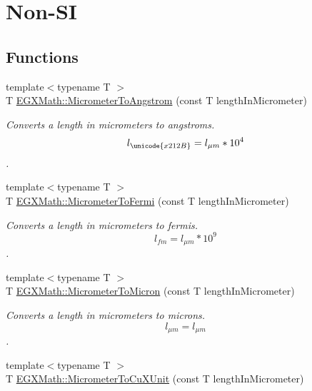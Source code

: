 \hypertarget{group___e_g_x_math-_conversions-_length_conversions-_s_i-_micrometer-_non-_s_i}{}\section{Non-\/\+SI}
\label{group___e_g_x_math-_conversions-_length_conversions-_s_i-_micrometer-_non-_s_i}
\subsection*{Functions}
\begin{DoxyCompactItemize}
\item 
{\footnotesize template$<$typename T $>$ }\\T \mbox{\hyperlink{group___e_g_x_math-_conversions-_length_conversions-_s_i-_micrometer-_non-_s_i_ga4b7df35169682046455e9a6f99447777}{E\+G\+X\+Math\+::\+Micrometer\+To\+Angstrom}} (const T length\+In\+Micrometer)
\begin{DoxyCompactList}\small\item\em Converts a length in micrometers to angstroms. \[ l_{\unicode{x212B}}=l_{\mu m} * 10^{4} \]. \end{DoxyCompactList}\item 
{\footnotesize template$<$typename T $>$ }\\T \mbox{\hyperlink{group___e_g_x_math-_conversions-_length_conversions-_s_i-_micrometer-_non-_s_i_ga23f5f429bc4df952e3d874fb944bd1ce}{E\+G\+X\+Math\+::\+Micrometer\+To\+Fermi}} (const T length\+In\+Micrometer)
\begin{DoxyCompactList}\small\item\em Converts a length in micrometers to fermis. \[ l_{fm}=l_{\mu m} * 10^{9} \]. \end{DoxyCompactList}\item 
{\footnotesize template$<$typename T $>$ }\\T \mbox{\hyperlink{group___e_g_x_math-_conversions-_length_conversions-_s_i-_micrometer-_non-_s_i_ga5dc2a5dba0313f6a71db082aff501329}{E\+G\+X\+Math\+::\+Micrometer\+To\+Micron}} (const T length\+In\+Micrometer)
\begin{DoxyCompactList}\small\item\em Converts a length in micrometers to microns. \[ l_{\mu m}=l_{\mu m} \]. \end{DoxyCompactList}\item 
{\footnotesize template$<$typename T $>$ }\\T \mbox{\hyperlink{group___e_g_x_math-_conversions-_length_conversions-_s_i-_micrometer-_non-_s_i_ga9ec609bbfdde5144c9f40d9093a5b8a7}{E\+G\+X\+Math\+::\+Micrometer\+To\+Cu\+X\+Unit}} (const T length\+In\+Micrometer)

\end{DoxyCompactItemize}
